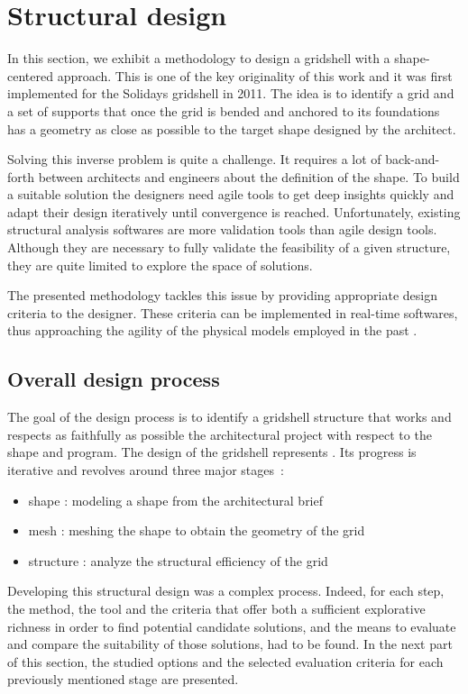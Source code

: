 \section{Structural design}\label{sec=proj_design}

In this section, we exhibit a methodology to design a gridshell with a shape-centered approach. This is one of the key originality of this work and it was first implemented for the Solidays gridshell in 2011. The idea is to identify a grid and a set of supports that once the grid is bended and anchored to its foundations has a geometry as close as possible to the target shape designed by the architect.

Solving this inverse problem is quite a challenge. It requires a lot of back-and-forth between architects and engineers about the definition of the shape. To build a suitable solution the designers need agile tools to get deep insights quickly and adapt their design iteratively until convergence is reached. Unfortunately, existing structural analysis softwares are more validation tools than agile design tools. Although they are necessary to fully validate the feasibility of a given structure, they are quite limited to explore the space of solutions.

The presented methodology tackles this issue by providing appropriate design criteria to the designer. These criteria can be implemented in real-time softwares, thus approaching the agility of the physical models employed in the past \cite{Addis2013}.

\subsection{Overall design process}

The goal of the design process is to identify a gridshell structure that works and respects as faithfully as possible the architectural project with respect to the shape and program. The design of the gridshell represents . Its progress is iterative and revolves around three major stages~:
\begin{itemize}
\item shape : modeling a shape from the architectural brief
\item mesh : meshing the shape to obtain the geometry of the grid
\item structure : analyze the structural efficiency of the grid
\end{itemize}
Developing this structural design was a complex process. Indeed, for each step, the method, the tool and the criteria that offer both a sufficient explorative richness in order to find potential candidate solutions, and the means to evaluate and compare the suitability of those solutions, had to be found. In the next part of this section, the studied options and the selected evaluation criteria for each previously mentioned stage are presented.

